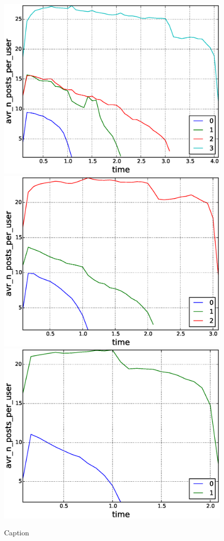 \begin{figure}[!tb]
\includegraphics[scale=0.2]{./images/avr_posts_per_user_for_surviving_year_for_2011.eps}
\includegraphics[scale=0.2]{./images/avr_posts_per_user_for_surviving_year_for_2012.eps}
\includegraphics[scale=0.2]{./images/avr_posts_per_user_for_surviving_year_for_2013.eps}
\caption{Caption}
\label{fig:avr_posts_per_user_for_surviving_year}
\end{figure}

